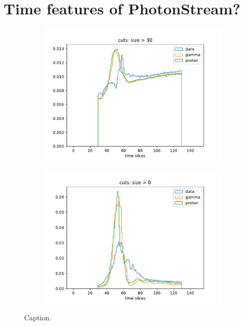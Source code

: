 \section{Time features of PhotonStream?}
%
\begin{figure}
  \begin{subfigure}{0.5\textwidth}
    \includegraphics[width=1.1\textwidth]{Plots/all_slices.pdf}
  \end{subfigure}
  \begin{subfigure}{0.5\textwidth}
    \includegraphics[width=1.1\textwidth]{Plots/all_slices_10_per_pixel.pdf}
  \end{subfigure}
  \caption{Caption.}
  \label{fig:slices}
\end{figure}

